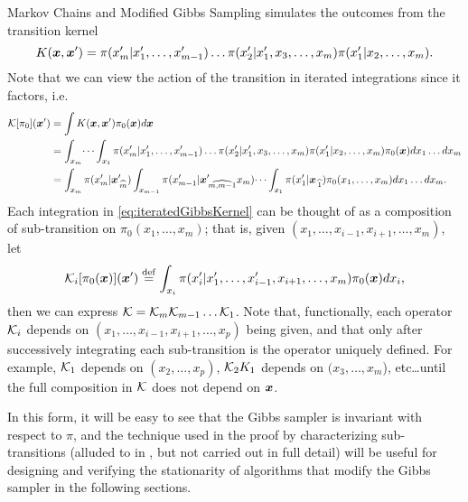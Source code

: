 \begin{chapter}{Markov Chains and Modified Gibbs Sampling}
 simulates the outcomes from the transition kernel 
\begin{equation}
  K(\mbox{\boldmath$x$},\mbox{\boldmath$x$}') = \pi(x_m'|x_1',\dots,x_{m-1}')\dots\pi(x_2'|x_1',x_3,\dots,x_m)\pi(x_1'|x_2,\dots,x_m).
\end{equation}
Note that we can view the action of the transition in iterated integrations since it factors, i.e.
\begin{align}
  \mathcal K [\pi_0](\mbox{\boldmath$x$}') 
    &= \int K(\mbox{\boldmath$x$},\mbox{\boldmath$x$}') \pi_0(\mbox{\boldmath$x$}) d\mbox{\boldmath$x$} \nonumber \\
    &= \int_{x_m}\dots\int_{x_1}\pi(x_m'|x_1',\dots,x_{m-1}')\dots\pi(x_2'|x_1',x_3,\dots,x_m)\pi(x_1'|x_2,\dots,x_m) \pi_0(\mbox{\boldmath$x$})dx_1\dots dx_m \nonumber\\ 
    &= \int_{x_m}\pi(x_m'|\mbox{\boldmath$x$}_{\,\widehat{m}}')\int_{x_{m-1}} \pi(x_{m-1}'|\mbox{\boldmath$x$}_{\,\widehat{m,m-1}}'x_m)\dots\int_{x_1} \pi(x_1'|\mbox{\boldmath$x$}_{\,\widehat{1}}) \pi_0(x_1,\dots,x_m)dx_1\dots dx_m. \label{eq:iteratedGibbsKernel}
\end{align}
Each integration in \eqref{eq:iteratedGibbsKernel} can be thought of as a composition of sub-transition on $\pi_0(x_1,\dots,x_m)$; that is, given $(x_1,\dots,x_{i-1},x_{i+1},\dots,x_m)$, let
\begin{equation}
  \mathcal K_i[\pi_0(\mbox{\boldmath$x$})](\mbox{\boldmath$x$}') \stackrel{\rm def}{=} \int_{x_i} \pi(x_i'|x_1',\dots,x_{i-1}',x_{i+1},\dots,x_m) \pi_0(\mbox{\boldmath$x$})dx_i,
\end{equation}
then we can express $\mathcal K = \mathcal K_m\mathcal K_{m-1} \dots \mathcal K_1$.
Note that, functionally, each operator $\mathcal K_i$ depends on $(x_1,\dots,x_{i-1},x_{i+1},\dots,x_p)$ being given, and that only after successively integrating each sub-transition is the operator uniquely defined.
For example, $\mathcal K_1$ depends on $(x_2,\dots,x_p)$, $\mathcal K_2 K_1$ depends on $(x_3,\dots,x_m$), etc\dots until the full composition in $\mathcal K$ does not depend on $\mbox{\boldmath$x$}$.

In this form, it will be easy to see that the Gibbs sampler is invariant with respect to $\pi$, and the technique used in the proof by characterizing sub-transitions (alluded to in \citep{robert2013monte}, but not carried out in full detail) will be useful for designing and verifying the stationarity of algorithms that modify the Gibbs sampler in the following sections.


\end{chapter}
